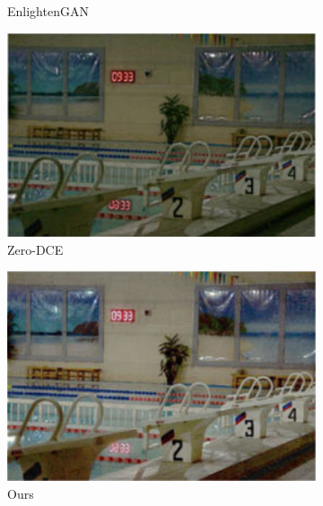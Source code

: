 \documentclass[a4paper]{ctexart}
\begin{document}
\begin{figure}[htb]
\begin{subfigure}{0.19\textwidth}
			\captionsetup{font=scriptsize}
			\caption{EnlightenGAN}
			\label{fig: LLI EnlightenGAN}	
		\end{subfigure}
		\begin{subfigure}{0.19\textwidth}
			\includegraphics[width=\linewidth]{picture/LLIE/Efficent/Zero-DCE}
			\captionsetup{font=scriptsize}
			\caption{Zero-DCE}
			\label{fig: Zero-DCE}	
		\end{subfigure}
		\begin{subfigure}{0.19\textwidth}
			\includegraphics[width=\linewidth]{picture/LLIE/Efficent/Ours}
			\captionsetup{font=scriptsize}
			\caption{Ours}
			\label{fig: Ours}	
		\end{subfigure}
		\begin{subfigure}{0.19\textwidth}

\end{subfigure}
\end{figure}
\end{document}
